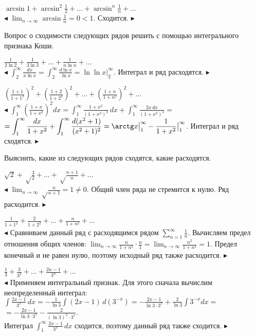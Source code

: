 \documentclass[a5paper,10pt]{article}
\begin{document}
\medskip
{} $\displaystyle\arcsin 1+\arcsin^2\frac12+\ldots+
\arcsin^n\frac1n+\dots$\\
$\blacktriangleleft$ $\displaystyle\lim_{n\to\infty}\arcsin\frac1n=0<1$. Сходится.
$\blacktriangleright$

\medskip
\noindent Вопрос о сходимости следующих рядов решить с помощью интегрального
признака Коши.

\medskip
{} $\displaystyle\frac{1}{2\ln2}+\frac{1}{3\ln3}+\ldots+
\frac{1}{n\ln n}+\ldots$\\

\smallskip
\noindent$\blacktriangleleft$ $\displaystyle\int_2^\infty\frac{dx}{x\ln x}=
\int_2^\infty\frac{d\ln x}{\ln x}=\ln\ln x\big|_2^\infty$. Интеграл и ряд расходятся.
$\blacktriangleright$

\medskip
{} $\displaystyle\left(\frac{1+1}{1+1^2}\right)^2+
\left(\frac{1+2}{1+2^2}\right)^2+\ldots+\left(\frac{1+n}{1+n^2}\right)^2+
\ldots$\\
$\blacktriangleleft$ $\displaystyle\int_1^\infty\left(\frac{1+x}{1+x^2}\right)^2dx=
\int_1^\infty\frac{1+x^2}{(1+x^2)^2}\,dx+\int_1^\infty\frac{2x\,dx}{(1+x^2)^2}=$\\
$\displaystyle =
\int_1^\infty\frac{dx}{1+x^2}+\int_1^\infty\frac{d(x^2+1)}{(x^2+1)^2}=
\arctg x\big|_1^\infty-\frac{1}{1+x^2}\big|_1^\infty$. Интеграл и ряд сходятся.
$\blacktriangleright$

\medskip
\noindent Выяснить, какие из следующих рядов сходятся, какие расходятся.

\medskip
{} $\displaystyle\sqrt2+\sqrt\frac32+\ldots+\sqrt\frac{n+1}{n}+\ldots$\\
$\blacktriangleleft$ $\displaystyle\lim_{n\to\infty}\sqrt\frac{n}{n+1}=1\ne0$.
Общий член ряда не стремится к нулю. Ряд расходится. $\blacktriangleright$

\medskip
{} $\displaystyle\frac{1}{1+1^2}+\frac{2}{1+2^2}+\ldots+
\frac{n}{1+n^2}+\ldots$\\
$\blacktriangleleft$ Сравниваем данный ряд с расходящимся рядом
$\displaystyle\sum_{n=1}^\infty\frac1n$. Вычисляем предел отношения общих членов:
$\displaystyle\lim_{n\to\infty}\frac{n}{1+n^2}\cdot\frac{n}{1}=
\lim_{n\to\infty}\frac{n^2}{1+n^2}=1$. Предел конечный и не равен нулю, поэтому
исходный ряд также расходится. $\blacktriangleright$

\medskip
{} $\displaystyle\frac13+\frac{3}{3^2}+\ldots+\frac{2n-1}{3^n}+\ldots$\\
$\blacktriangleleft$ Применяем интегральный признак. Для этого сначала вычислим
неопределенный интеграл:\\
$\displaystyle\int\frac{2x-1}{3^x}\,dx=-\frac{1}{\ln3}\int(2x-1)\,d(3^{-x})=
-\frac{2x-1}{\ln3\cdot3^x}+\frac{2}{\ln3}\int 3^{-x}dx=$\\
$\displaystyle =
-\frac{2x-1}{\ln3\cdot3^x}-\frac{2}{(\ln3)^2\cdot 3^x}$.\\
Интеграл $\displaystyle\int_1^\infty\frac{2x-1}{3^x}\,dx$ сходится, поэтому
данный ряд также сходится. $\blacktriangleright$
\end{document}
